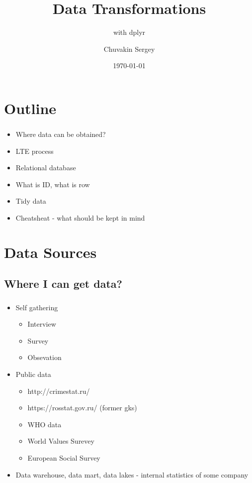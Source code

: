 \documentclass[t, 11pt]{beamer}
\title {Data Transformations}
\subtitle{with dplyr}
\author{Chuvakin Sergey}
\date{\today}
\institute[<<Anthropology>>]{<<School of Advanced Studies>>}
\begin{document}
	
	\frame[plain]{\titlepage}		
	
	\section{Outline}
	
		\begin{frame} 
			\frametitle{\insertsection} 
			\begin{itemize}
				\item Where data can be obtained?
				\item LTE process
				\item Relational database 
				\item What is ID, what is row 
				\item Tidy data 
				\item Cheatsheat  - what should be kept in mind
			\end{itemize}
		\end{frame}
	
	\section{Data Sources}
		\subsection{Where  I can get data?}

	\begin{frame} 
		\frametitle{\insertsection} 
		\framesubtitle{\insertsubsection}
		\begin{itemize}
			\item Self gathering
			\begin{itemize}
				\item Interview 
				\item Survey 
				\item Obsevation 
			\end{itemize}
			\item Public data 
			\begin{itemize}
				\item http://crimestat.ru/
				\item https://rosstat.gov.ru/ (former gks)
				\item WHO data 
				\item World Values Surevey
				\item European Social Survey
			\end{itemize}
			\item Data warehouse, data mart, data lakes - internal statistics of some company 
		\end{itemize}
	
	\end{frame}
\end{document}
